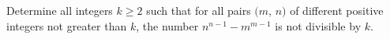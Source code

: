 Determine all integers $ k\ge 2$ such that for all pairs $ (m$,  $ n)$ of different positive integers not greater than $ k$,  the number $ n^{n-1}-m^{m-1}$ is not divisible by $ k$.